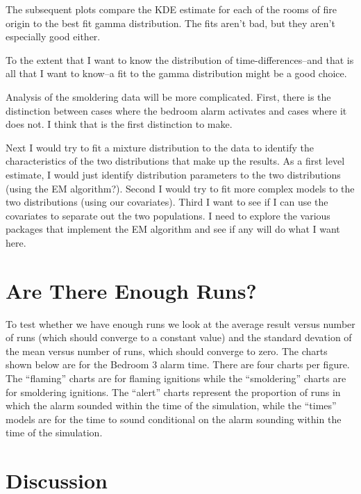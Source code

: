 \documentclass[
]{article}
\begin{document}
The subsequent plots compare the KDE estimate for each of the rooms of
fire origin to the best fit gamma distribution. The fits aren't bad, but
they aren't especially good either.

To the extent that I want to know the distribution of
time-differences--and that is all that I want to know--a fit to the
gamma distribution might be a good choice.

Analysis of the smoldering data will be more complicated. First, there
is the distinction between cases where the bedroom alarm activates and
cases where it does not. I think that is the first distinction to make.

Next I would try to fit a mixture distribution to the data to identify
the characteristics of the two distributions that make up the results.
As a first level estimate, I would just identify distribution parameters
to the two distributions (using the EM algorithm?). Second I would try
to fit more complex models to the two distributions (using our
covariates). Third I want to see if I can use the covariates to separate
out the two populations. I need to explore the various packages that
implement the EM algorithm and see if any will do what I want here.

\hypertarget{are-there-enough-runs}{%
\section{Are There Enough Runs?}\label{are-there-enough-runs}}

To test whether we have enough runs we look at the average result versus
number of runs (which should converge to a constant value) and the
standard devation of the mean versus number of runs, which should
converge to zero. The charts shown below are for the Bedroom 3 alarm
time. There are four charts per figure. The ``flaming'' charts are for
flaming ignitions while the ``smoldering'' charts are for smoldering
ignitions. The ``alert'' charts represent the proportion of runs in
which the alarm sounded within the time of the simulation, while the
``times'' models are for the time to sound conditional on the alarm
sounding within the time of the simulation.

\hypertarget{discussion-1}{%
\section{Discussion}\label{discussion-1}}
\end{document}
